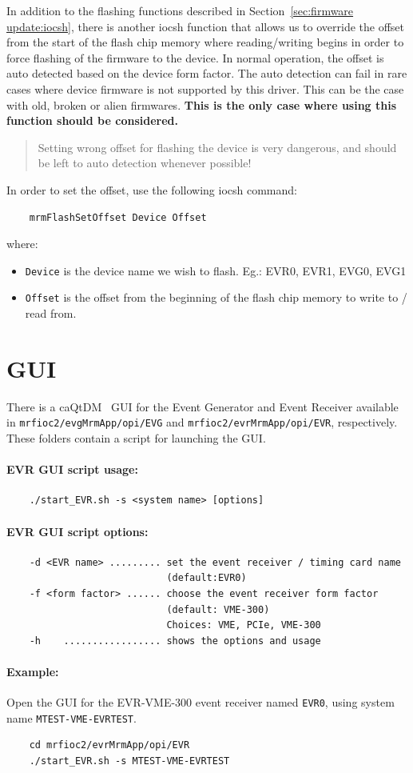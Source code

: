 \documentclass[12pt,a4paper]{article}
\let\stdsection\section
\renewcommand\section{\newpage\stdsection}
\begin{document}
In addition to the flashing functions described in Section~\ref{sec:firmware update:iocsh}, there is another iocsh function that allows us to override the offset from the start of the flash chip memory where reading/writing begins in order to force flashing of the firmware to the device. In normal operation, the offset is auto detected based on the device form factor. The auto detection can fail in rare cases where device firmware is not supported by this driver. This can be the case with old, broken or alien firmwares. \textbf{This is the only case where using this function should be considered.}
\begin{quote}
Setting wrong offset for flashing the device is very dangerous, and should be left to auto detection whenever possible!
\end{quote}
In order to set the offset, use the following iocsh command:
\begin{verbatim}
	mrmFlashSetOffset Device Offset
\end{verbatim}
where:
\begin{itemize}
	\item \texttt{Device} is the device name we wish to flash. Eg.: EVR0, EVR1, EVG0, EVG1
	\item \texttt{Offset} is the offset from the beginning of the flash chip memory to write to / read from.
\end{itemize}


\section{GUI}\label{sec:GUI}
There is a caQtDM~\cite{caqtdm} GUI for the Event Generator and Event Receiver available in \texttt{mrfioc2/evgMrmApp/opi/EVG} and \texttt{mrfioc2/evrMrmApp/opi/EVR}, respectively. These folders contain a script for launching the GUI.

\paragraph{EVR GUI script usage:}
\begin{verbatim}
	./start_EVR.sh -s <system name> [options]
\end{verbatim}


\paragraph{EVR GUI script options:}
\begin{verbatim}
	-d <EVR name> ......... set the event receiver / timing card name 
	                        (default:EVR0)
	-f <form factor> ...... choose the event receiver form factor 
	                        (default: VME-300)
	                        Choices: VME, PCIe, VME-300
	-h    ................. shows the options and usage
\end{verbatim}


\paragraph{Example:} Open the GUI for the EVR-VME-300 event receiver named \texttt{EVR0}, using system name \texttt{MTEST-VME-EVRTEST}.
\begin{verbatim}
	cd mrfioc2/evrMrmApp/opi/EVR
	./start_EVR.sh -s MTEST-VME-EVRTEST
\end{verbatim}




\end{document}

